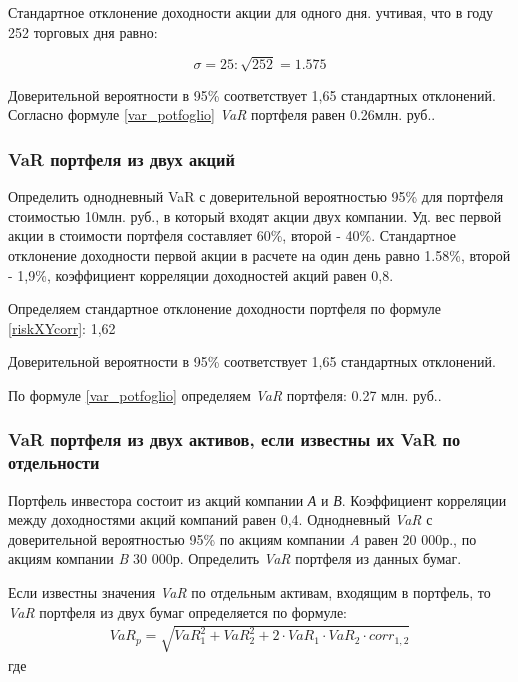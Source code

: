 \documentclass[12pt, table, a4paper,twoside]{exam}
\begin{document}
\begin{questions}
\begin{solution}[12em]

\raggedright
Стандартное отклонение доходности акции для одного дня. учтивая, что в году 252 торговых дня равно:

$$\sigma=25:\sqrt{252}=1.575$$

Доверительной вероятности в 95\% соответствует 1,65 стандартных отклонений. Согласно формуле \eqref{var_potfoglio} \textit{VaR} портфеля равен 0.26млн. руб..

\end{solution}

\subsubsection{VaR портфеля из двух акций}
\question[10] Определить однодневный VaR с доверительной вероятностью 95\% для портфеля стоимостью 10млн. руб., в который входят акции двух компании. Уд. вес первой акции в стоимости портфеля составляет 60\%, второй - 40\%. Стандартное отклонение доходности первой акции в расчете на один день равно 1.58\%, второй - 1,9\%, коэффициент корреляции доходностей акций равен 0,8.

\begin{solution}[12em]
	
	\raggedright
	Определяем стандартное отклонение доходности портфеля по формуле \eqref{riskXYcorr}: 1,62%
	
	Доверительной вероятности в 95\% соответствует 1,65 стандартных отклонений. 
	
	По формуле \eqref{var_potfoglio} определяем \textit{VaR }портфеля: 0.27 млн. руб..
\end{solution}


\subsubsection{VaR портфеля из двух активов, если известны их VaR по отдельности}
\question[10] Портфель инвестора состоит из акций компании \textit{А} и \textit{В}. Коэффициент корреляции между доходностями акций компаний равен 0,4. Однодневный \textit{VaR }с доверительной вероятностью 95\% по акциям компании \textit{A} равен 20 000р., по акциям компании \textit{B} 30 000р. Определить \textit{VaR }портфеля из данных бумаг.

\begin{solution}[12em]

\raggedright
Если известны значения \textit{VaR }по отдельным активам, входящим в портфель, то \textit{VaR }портфеля из двух бумаг определяется по формуле:
\begin{align}
\label{var_potfoglioXY}
VaR_p=\sqrt{VaR_1^2+VaR_2^2+2 \cdot VaR_1\cdot VaR_2 \cdot corr_{1,2}}
\end{align}
где


\end{solution}
\end{questions}
\end{document}
